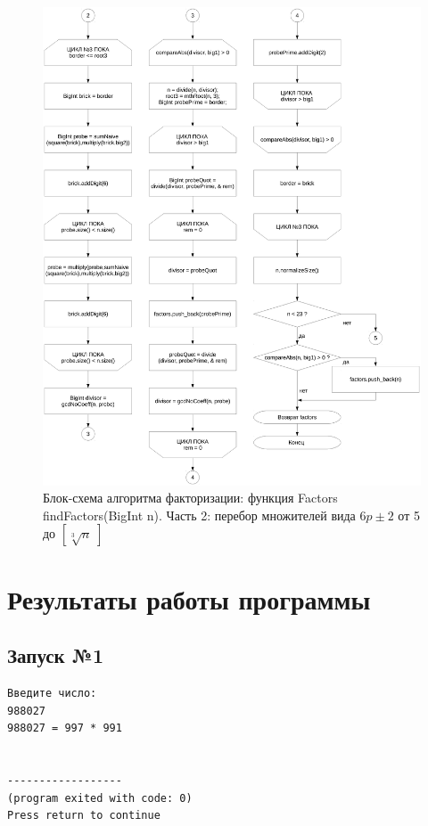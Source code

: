 \documentclass[a4paper,12pt]{article} %
\begin{document}
\begin{figure}[ht]
	\centering
	\includegraphics[width=\textwidth]{lr7_findFactors-2.pdf}
	\caption{
		Блок-схема алгоритма факторизации: функция Factors findFactors(BigInt n).
		Часть 2: перебор множителей вида $6p\pm2$ от 5 до $[\sqrt[3]{n}\;]$
	}
\end{figure}

\clearpage

\section*{Результаты работы программы}




\subsection*{Запуск №1}
\begin{verbatim}
Введите число:
988027
988027 = 997 * 991


------------------
(program exited with code: 0)
Press return to continue
\end{verbatim}
\end{document}
